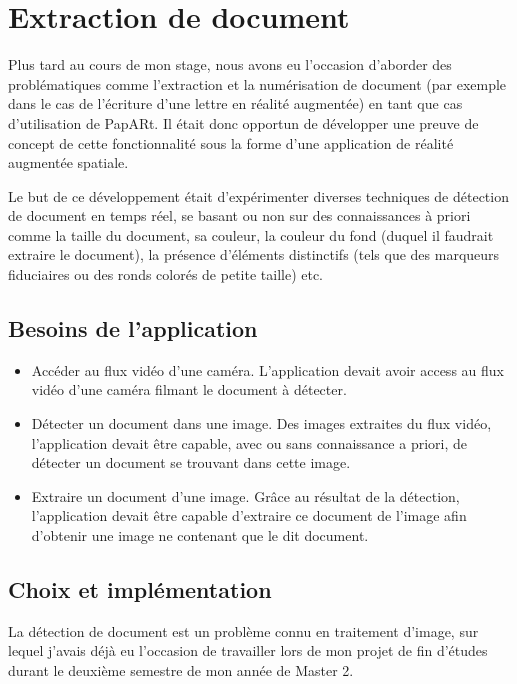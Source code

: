 \newpage
\section{Extraction de document}
\label{sec:document}
Plus tard au cours de mon stage, nous avons eu l'occasion d'aborder des problématiques comme l'extraction et la numérisation de document (par exemple dans le cas de l'écriture d'une lettre en réalité augmentée) en tant que cas d'utilisation de PapARt. Il était donc opportun de développer une preuve de concept de cette fonctionnalité sous la forme d'une application de réalité augmentée spatiale.

Le but de ce développement était d'expérimenter diverses techniques de détection de document en temps réel, se basant ou non sur des connaissances à priori comme la taille du document, sa couleur, la couleur du fond (duquel il faudrait extraire le document), la présence d'éléments distinctifs (tels que des marqueurs fiduciaires ou des ronds colorés de petite taille) etc.

\subsection{Besoins de l'application}
\label{subsec:doc:content}
\begin{itemize}
\item Accéder au flux vidéo d'une caméra. L'application devait avoir access au flux vidéo d'une caméra filmant le document à détecter.
\item Détecter un document dans une image. Des images extraites du flux vidéo, l'application devait être capable, avec ou sans connaissance a priori, de détecter un document se trouvant dans cette image.
\item Extraire un document d'une image. Grâce au résultat de la détection, l'application devait être capable d'extraire ce document de l'image afin d'obtenir une image ne contenant que le dit document.
\end{itemize}

\subsection{Choix et implémentation}
\label{subsec:doc:impl}

La détection de document est un problème connu en traitement d'image, sur lequel j'avais déjà eu l'occasion de travailler lors de mon projet de fin d'études durant le deuxième semestre de mon année de Master 2.

